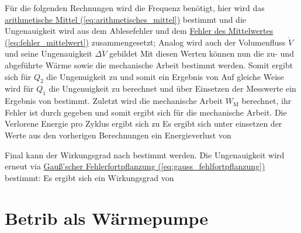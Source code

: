 Für die folgenden Rechnungen wird die Frequenz benötigt, hier wird das \hyperref[eq:arithmetisches_mittel]{arithmetische Mittel (\ref*{eq:arithmetisches_mittel})} bestimmt und die Ungenauigkeit wird aus dem Ablesefehler und dem \hyperref[eq:fehler_mittelwert]{Fehler des Mittelwertes (\ref*{eq:fehler_mittelwert})} zusammengesetzt;
Analog wird auch der Volumenfluss $\dot V$ und seine Ungenauigkeit $\Delta \dot V$ gebildet
Mit diesen Werten können nun die zu- und abgeführte Wärme sowie die mechanische Arbeit bestimmt werden.
Somit ergibt sich für $Q_2$ die Ungenuigkeit zu
und somit ein Ergebnis von
Auf gleiche Weise wird für $Q_1$ die Ungenuigkeit zu
berechnet und über Einsetzen der Messwerte ein Ergebnis von
bestimmt. Zuletzt wird die mechanische Arbeit $W_\text{M}$ berechnet, ihr Fehler ist durch
gegeben und somit ergibt sich
für die mechanische Arbeit.
Die Verlorene Energie pro Zyklus ergibt sich zu 
Es ergibt sich unter einsetzen der Werte aus den vorherigen Berechnungen ein Energieverlust von 


Final kann der Wirkungsgrad nach  bestimmt werden. Die Ungenauigkeit wird erneut via \hyperref[eq:gauss_fehlfortpflanzung]{Gauß'scher Fehlerfortpflanzung (\ref*{eq:gauss_fehlfortpflanzung})} bestimmt:
Es ergibt sich ein Wirkungsgrad von


\section{Betrib als Wärmepumpe}
\label{sec:A2}

